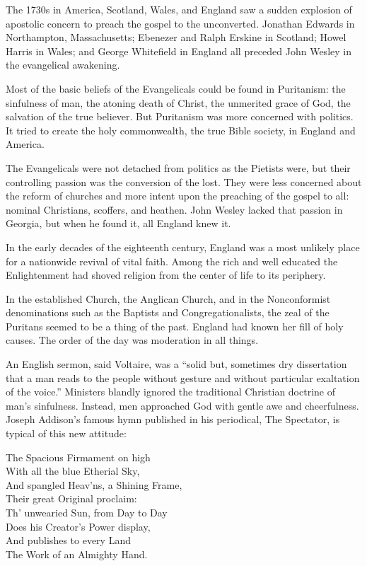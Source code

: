 The 1730s in America, Scotland, Wales, and England saw a sudden explosion of apostolic concern to
preach the gospel to the unconverted. Jonathan Edwards in Northampton, Massachusetts; Ebenezer and
Ralph Erskine in Scotland; Howel Harris in Wales; and George Whitefield in England all preceded John
Wesley in the evangelical awakening.

Most of the basic beliefs of the Evangelicals could be found in Puritanism: the sinfulness of man,
the atoning death of Christ, the unmerited grace of God, the salvation of the true believer. But
Puritanism was more concerned with politics. It tried to create the holy commonwealth, the true
Bible society, in England and America.

The Evangelicals were not detached from politics as the Pietists were, but their controlling passion
was the conversion of the lost. They were less concerned about the reform of churches and more
intent upon the preaching of the gospel to all: nominal Christians, scoffers, and heathen. John
Wesley lacked that passion in Georgia, but when he found it, all England knew it.

In the early decades of the eighteenth century, England was a most unlikely place for a nationwide
revival of vital faith. Among the rich and well educated the Enlightenment had shoved religion from
the center of life to its periphery.

In the established Church, the Anglican Church, and in the Nonconformist denominations such as the
Baptists and Congregationalists, the zeal of the Puritans seemed to be a thing of the past. England
had known her fill of holy causes. The order of the day was moderation in all things.

An English sermon, said Voltaire, was a “solid but, sometimes dry dissertation that a man reads to
the people without gesture and without particular exaltation of the voice.” Ministers blandly
ignored the traditional Christian doctrine of man’s sinfulness. Instead, men approached God with
gentle awe and cheerfulness. Joseph Addison’s famous hymn published in his periodical, The
Spectator, is typical of this new attitude:

\begin{poem}
The Spacious Firmament on high\\
With all the blue Etherial Sky,\\
And spangled Heav’ns, a Shining Frame,\\
Their great Original proclaim:\\
Th’ unwearied Sun, from Day to Day\\
Does his Creator’s Power display,\\
And publishes to every Land\\
The Work of an Almighty Hand.
\end{poem}

